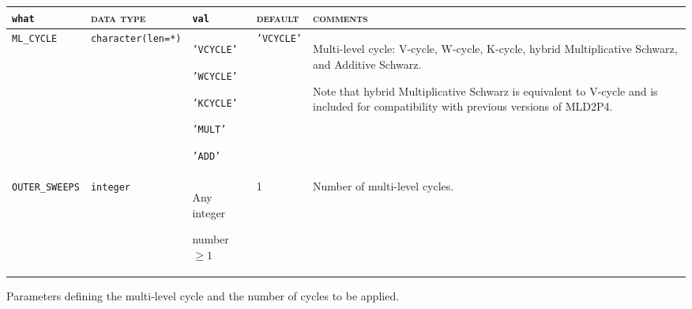 \bsideways
\begin{center}
\begin{tabular}{|p{3.6cm}|l|p{2.4cm}|p{2.4cm}|p{7.2cm}|}
\hline
\verb|what|              & \textsc{data type}        &  \verb|val|      &  \textsc{default}  &
\textsc{comments} \\ \hline
\verb|ML_CYCLE|     & \verb|character(len=*)|
                         & \texttt{'VCYCLE'} \par \texttt{'WCYCLE'}   \par \texttt{'KCYCLE'} \par
                             \texttt{'MULT'} \par \texttt{'ADD'}
                         & \texttt{'VCYCLE'}
                         &Multi-level cycle: V-cycle, W-cycle, K-cycle, hybrid Multiplicative Schwarz,
                           and Additive Schwarz. \par
                           Note that hybrid Multiplicative Schwarz is equivalent to V-cycle and
                           is included for compatibility with previous versions of MLD2P4. \\ \hline
 \verb|OUTER_SWEEPS| & \texttt{integer} &
                           Any integer \par number $\ge 1$  & 1 &
                           Number of multi-level cycles. \\ \hline
\end{tabular}
\end{center}
\caption{Parameters defining the multi-level cycle and the number of cycles to
be applied.
\label{tab:p_cycle}}                       
\esideways
                   
